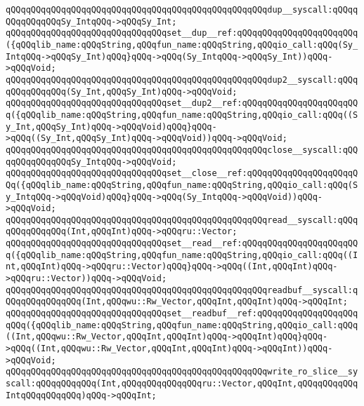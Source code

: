 \verb|qQQqqQQqqQQqqQQqqQQqqQQqqQQqqQQqqQQqqQQqqQQqqQQqqQQqdup__syscall:qQQqqQQqqQQqqQQqSy_IntqQQq->qQQqSy_Int;|\newline
\verb|qQQqqQQqqQQqqQQqqQQqqQQqqQQqqQQqset__dup__ref:qQQqqQQqqQQqqQQqqQQqqQQq({qQQqlib_name:qQQqString,qQQqfun_name:qQQqString,qQQqio_call:qQQq(Sy_IntqQQq->qQQqSy_Int)qQQq}qQQq->qQQq(Sy_IntqQQq->qQQqSy_Int))qQQq->qQQqVoid;|\newline
\newline
\verb|qQQqqQQqqQQqqQQqqQQqqQQqqQQqqQQqqQQqqQQqqQQqqQQqqQQqdup2__syscall:qQQqqQQqqQQqqQQq(Sy_Int,qQQqSy_Int)qQQq->qQQqVoid;|\newline
\verb|qQQqqQQqqQQqqQQqqQQqqQQqqQQqqQQqset__dup2__ref:qQQqqQQqqQQqqQQqqQQqqQQq({qQQqlib_name:qQQqString,qQQqfun_name:qQQqString,qQQqio_call:qQQq((Sy_Int,qQQqSy_Int)qQQq->qQQqVoid)qQQq}qQQq->qQQq((Sy_Int,qQQqSy_Int)qQQq->qQQqVoid))qQQq->qQQqVoid;|\newline
\newline
\verb|qQQqqQQqqQQqqQQqqQQqqQQqqQQqqQQqqQQqqQQqqQQqqQQqqQQqclose__syscall:qQQqqQQqqQQqqQQqSy_IntqQQq->qQQqVoid;|\newline
\verb|qQQqqQQqqQQqqQQqqQQqqQQqqQQqqQQqset__close__ref:qQQqqQQqqQQqqQQqqQQqqQQq({qQQqlib_name:qQQqString,qQQqfun_name:qQQqString,qQQqio_call:qQQq(Sy_IntqQQq->qQQqVoid)qQQq}qQQq->qQQq(Sy_IntqQQq->qQQqVoid))qQQq->qQQqVoid;|\newline
\newline
\verb|qQQqqQQqqQQqqQQqqQQqqQQqqQQqqQQqqQQqqQQqqQQqqQQqqQQqread__syscall:qQQqqQQqqQQqqQQq(Int,qQQqInt)qQQq->qQQqru::Vector;|\newline
\verb|qQQqqQQqqQQqqQQqqQQqqQQqqQQqqQQqset__read__ref:qQQqqQQqqQQqqQQqqQQqqQQq({qQQqlib_name:qQQqString,qQQqfun_name:qQQqString,qQQqio_call:qQQq((Int,qQQqInt)qQQq->qQQqru::Vector)qQQq}qQQq->qQQq((Int,qQQqInt)qQQq->qQQqru::Vector))qQQq->qQQqVoid;|\newline
\newline
\verb|qQQqqQQqqQQqqQQqqQQqqQQqqQQqqQQqqQQqqQQqqQQqqQQqqQQqreadbuf__syscall:qQQqqQQqqQQqqQQq(Int,qQQqwu::Rw_Vector,qQQqInt,qQQqInt)qQQq->qQQqInt;|\newline
\verb|qQQqqQQqqQQqqQQqqQQqqQQqqQQqqQQqset__readbuf__ref:qQQqqQQqqQQqqQQqqQQqqQQq({qQQqlib_name:qQQqString,qQQqfun_name:qQQqString,qQQqio_call:qQQq((Int,qQQqwu::Rw_Vector,qQQqInt,qQQqInt)qQQq->qQQqInt)qQQq}qQQq->qQQq((Int,qQQqwu::Rw_Vector,qQQqInt,qQQqInt)qQQq->qQQqInt))qQQq->qQQqVoid;|\newline
\newline
\verb|qQQqqQQqqQQqqQQqqQQqqQQqqQQqqQQqqQQqqQQqqQQqqQQqqQQqwrite_ro_slice__syscall:qQQqqQQqqQQq(Int,qQQqqQQqqQQqqQQqru::Vector,qQQqInt,qQQqqQQqqQQqIntqQQqqQQqqQQq)qQQq->qQQqInt;|\newline
